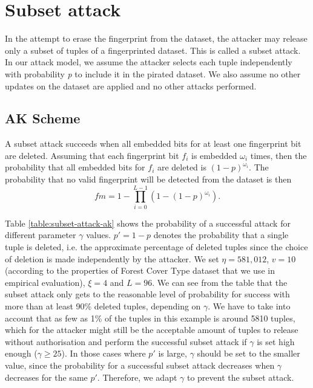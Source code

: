 \section{Subset attack} \label{subsec:subset-attack}
In the attempt to erase the fingerprint from the dataset, the attacker may release only a subset of tuples of a fingerprinted dataset. 
This is called a subset attack. 
In our attack model, we assume the attacker selects each tuple independently with probability \textit{p} to include it in the pirated dataset. 
We also assume no other updates on the dataset are applied and no other attacks performed. 

\subsection{AK Scheme}\label{subsubsec:subset-ak}
A subset attack succeeds when all embedded bits for at least one fingerprint bit are deleted. Assuming that each fingerprint bit $f_i$ is embedded $\omega_i$ times, then the probability that all embedded bits for $f_i$ are deleted is $(1-p)^{\omega_i}$. The probability that no valid fingerprint will be detected from the dataset is then 
\begin{equation} \label{eq:subset-attack-ak}
    fm = 1 - {\prod_{i=0}^{L-1}(1-(1-p)^{\omega_i})}.
\end{equation}

Table \ref{table:subset-attack-ak} shows the probability of a successful attack for different parameter $\gamma$ values. 
$p'=1-p$ denotes the probability that a single tuple is deleted, i.e. the approximate percentage of deleted tuples since the choice of deletion is made independently by the attacker. 
We set $\eta = 581,012$, $v=10$ (according to the properties of Forest Cover Type dataset that we use in empirical evaluation), $\xi=4$ and $L=96$.
We can see from the table that the subset attack only gets to the reasonable level of probability for success with more than at least 90\% deleted tuples, depending on $\gamma$. 
We have to take into account that as few as 1\% of the tuples in this example is around 5810 tuples, which for the attacker might still be the acceptable amount of tuples to release without authorisation and perform the successful subset attack if $\gamma$ is set high enough ($\gamma \geq 25$). 
In those cases where $p'$ is large, $\gamma$ should be set to the smaller value, since the probability for a successful subset attack decreases when $\gamma$ decreases for the same $p'$.
Therefore, we adapt $\gamma$ to prevent the subset attack.

